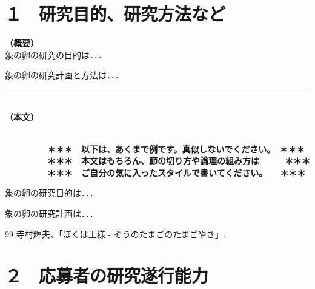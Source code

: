 \documentclass[11pt,a4j,dvipdfmx]{jarticle} 					%
\newcommand{\研究課題名}{象の卵}
\newcommand{\研究機関名}{逢坂大学}
\newcommand{\研究代表者氏名}{湯川秀樹}
\newcommand{\研究期間の最終元号年度}{6}  %
\begin{document}

\section{１　研究目的、研究方法など}

\noindent
\textbf{（概要）}\\
	象の卵の研究の目的は．．．	

	象の卵の研究計画と方法は．．．
	\vspace*{10zw}	%

\noindent
\rule{\linewidth}{1pt}\\
\noindent
\textbf{（本文）}
\JSPSInstructions	%

\textbf{\\　　　　　＊＊＊　以下は、あくまで例です。真似しないでください。　＊＊＊\\
　　　　　＊＊＊　本文はもちろん、節の切り方や論理の組み方は　　　＊＊＊\\
　　　　　＊＊＊　ご自分の気に入ったスタイルで書いてください。　　＊＊＊}

	 象の卵の研究目的は．．．

	象の卵の研究計画は．．．

		

	\vspace{1cm}
	\begin{thebibliography}{99}
		 寺村輝夫、「ぼくは王様 - ぞうのたまごのたまごやき」.
	\end{thebibliography}




\section{２　応募者の研究遂行能力}
\end{document}
